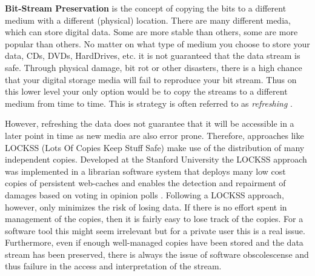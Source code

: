 \textbf{Bit-Stream Preservation}
is the concept of copying the bits to a different medium with a different (physical) location. There are many different media, which can store digital data. Some are more stable than others, some are more popular than others. No matter on what type of medium you choose to store your data, CDs, DVDs, HardDrives, etc. it is not guaranteed that the data stream is safe. Through physical damage, bit rot or other disasters, there is a high chance that your digital storage media will fail to reproduce your bit stream. Thus on this lower level your only option would be to copy the streams to a different medium from time to time. This is strategy is often referred to as \textit{refreshing} \cite{Lee:2002:SOTADP}.

However, refreshing the data does not guarantee that it will be accessible in a later point in time as new media are also error prone. Therefore, approaches like LOCKSS (Lots Of Copies Keep Stuff Safe) make use of the distribution of many independent copies. Developed at the Stanford University the LOCKSS approach was implemented in a librarian software system that deploys many low cost copies of persistent web-caches and enables the detection and repairment of damages based on voting in opinion polls \cite{reich2001lpw, Maniatis:2003:PPR:1165389.945451}.
Following a LOCKSS approach, however, only minimizes the risk of losing data. If there is no effort spent in management of the copies, then it is fairly easy to lose track of the copies. For a software tool this might seem irrelevant but for a private user this is a real issue. Furthermore, even if enough well-managed copies have been stored and the data stream has been preserved, there is always the issue of software obscolescense and thus failure in the access and interpretation of the stream. \newline

